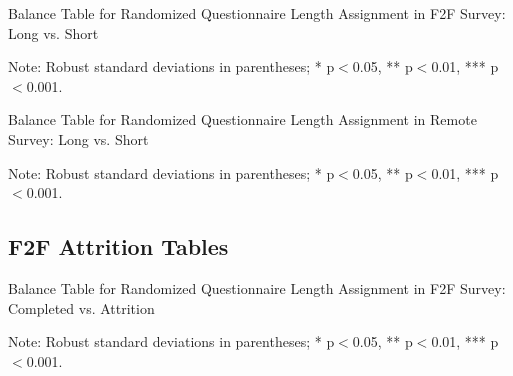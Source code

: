 \documentclass[11pt,harvard]{article}
\begin{document}
	
	
	\begin{table}[htbp]
		\centering
		\begin{adjustbox}{max width=\textwidth}
			\begin{threeparttable}
				\caption{Balance Table for Randomized Questionnaire Length Assignment in F2F Survey: Long vs. Short}
				\small
				 
				\label{tab:BF_Listing_Demo_Balance_F2F_Length}
				\begin{tablenotes}
					\item Note: Robust standard deviations in parentheses; * p$<$0.05, ** p$<$0.01, *** p$<$0.001.
				\end{tablenotes}
			\end{threeparttable}
		\end{adjustbox}
	\end{table}
	
	
	\begin{table}[htbp]
		\centering
		\begin{adjustbox}{max width=\textwidth}
			\begin{threeparttable}
				\caption{Balance Table for Randomized Questionnaire Length Assignment in Remote Survey: Long vs. Short}
				\small
				 
				\label{tab:BF_Listing_Demo_Balance_RM_Length}
				\begin{tablenotes}
					\item Note: Robust standard deviations in parentheses; * p$<$0.05, ** p$<$0.01, *** p$<$0.001.
				\end{tablenotes}
			\end{threeparttable}
		\end{adjustbox}
	\end{table}
	
	\pagebreak
	
	\subsection{F2F Attrition Tables}
	
	\begin{table}[htbp]
		\centering
		\begin{adjustbox}{max width=\textwidth}
			\begin{threeparttable}
				\caption{Balance Table for Randomized Questionnaire Length Assignment in F2F Survey: Completed vs. Attrition}
				\small
				 
				\label{tab:BF_Listing_Demo_Attrition_F2F}
				\begin{tablenotes}
					\item Note: Robust standard deviations in parentheses; * p$<$0.05, ** p$<$0.01, *** p$<$0.001.
				\end{tablenotes}
			\end{threeparttable}
		\end{adjustbox}
	\end{table}
	
\end{document}
